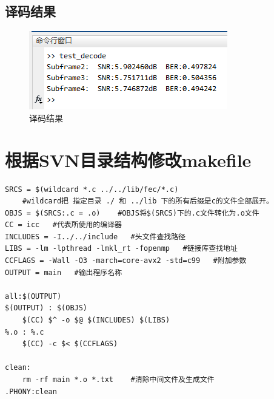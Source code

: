 \documentclass{article}
\begin{document}
\subsection{译码结果}
\begin{figure}[H]
	\centering
	\includegraphics[width = .8\textwidth]{res.png}
	\caption{译码结果}
\end{figure}

\section{根据SVN目录结构修改makefile}
\begin{lstlisting}
SRCS = $(wildcard *.c ../../lib/fec/*.c)
	#wildcard把 指定目录 ./ 和 ../lib 下的所有后缀是c的文件全部展开。
OBJS = $(SRCS:.c = .o)    #OBJS将$(SRCS)下的.c文件转化为.o文件
CC = icc   #代表所使用的编译器
INCLUDES = -I../../include   #头文件查找路径
LIBS = -lm -lpthread -lmkl_rt -fopenmp   #链接库查找地址
CCFLAGS = -Wall -O3 -march=core-avx2 -std=c99   #附加参数
OUTPUT = main   #输出程序名称

all:$(OUTPUT)
$(OUTPUT) : $(OBJS)
	$(CC) $^ -o $@ $(INCLUDES) $(LIBS)
%.o : %.c
	$(CC) -c $< $(CCFLAGS)

clean:
	rm -rf main *.o *.txt    #清除中间文件及生成文件
.PHONY:clean	
\end{lstlisting}






\end{document}
